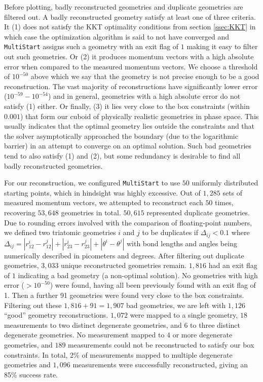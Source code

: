 Before plotting, badly reconstructed geometries and duplicate geometries are filtered out. A badly reconstructed geometry satisfy at least one of three criteria. It (1) does not satisfy the KKT optimality conditions from section \ref{ssec:KKT} in which case the optimization algorithm is said to not have converged and \texttt{MultiStart} assigns such a geometry with an exit flag of $1$ making it easy to filter out such geometries. Or (2) it produces momentum vectors with a high absolute error when compared to the measured momentum vectors. We choose a threshold of $10^{-50}$ above which we say that the geometry is not precise enough to be a good reconstruction. The vast majority of reconstructions have significantly lower error ($10^{-59} - 10^{-54}$) and in general, geometries with a high absolute error do not satisfy (1) either. Or finally, (3) it lies very close to the box constraints (within $0.001$) that form our cuboid of physically realistic geometries in phase space. This usually indicates that the optimal geometry lies outside the constraints and that the solver asymptotically approached the boundary (due to the logarithmic barrier) in an attempt to converge on an optimal solution. Such bad geometries tend to also satisfy (1) and (2), but some redundancy is desirable to find all badly reconstructed geometries.

For our reconstruction, we configured \texttt{MultiStart} to use $50$ uniformly distributed starting points, which in hindsight was highly excessive. Out of $1,285$ sets of measured momentum vectors, we attempted to reconstruct each $50$ times, recovering $53,648$ geometries in total. $50,615$ represented duplicate geometries. Due to rounding errors involved with the comparison of floating-point numbers, we defined two triatomic geometries $i$ and $j$ to be duplicates if $\Delta_{ij} < 0.1$ where $\Delta_{ij} = |r_{12}^i - r_{12}^j| + |r_{23}^i - r_{23}^j| + |\theta^i - \theta^j|$ with bond lengths and angles being numerically described in picometers and degrees. After filtering out duplicate geometries, $3,033$ unique reconstructed geometries remain. $1,816$ had an exit flag of $1$ indicating a bad geometry (a non-optimal solution). No geometries with high error ($>10^{-50}$) were found, having all been previously found with an exit flag of 1. Then a further 91 geometries were found very close to the box constraints. Filtering out these $1,816 + 91 = 1,907$ bad geometries, we are left with $1,126$ ``good'' geometry reconstructions. $1,072$ were mapped to a single geometry, $18$ measurements to two distinct degenerate geometries, and $6$ to three distinct degenerate geometries. No measurement mapped to $4$ or more degenerate geometries, and $189$ measurements could not be reconstructed to satisfy our box constraints. In total, 2\% of measurements mapped to multiple degenerate geometries and $1,096$ measurements were successfully reconstructed, giving an 85\% success rate.

